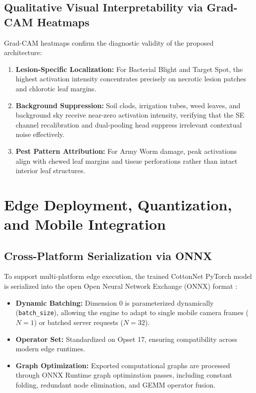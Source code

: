 \documentclass[journal,10pt,twocolumn]{IEEEtran}
\begin{document}
\subsection{Qualitative Visual Interpretability via Grad-CAM Heatmaps}
Grad-CAM heatmaps confirm the diagnostic validity of the proposed architecture:
\begin{enumerate}[leftmargin=*]
    \item \textbf{Lesion-Specific Localization:} For Bacterial Blight and Target Spot, the highest activation intensity concentrates precisely on necrotic lesion patches and chlorotic leaf margins.
    \item \textbf{Background Suppression:} Soil clods, irrigation tubes, weed leaves, and background sky receive near-zero activation intensity, verifying that the SE channel recalibration and dual-pooling head suppress irrelevant contextual noise effectively.
    \item \textbf{Pest Pattern Attribution:} For Army Worm damage, peak activations align with chewed leaf margins and tissue perforations rather than intact interior leaf structures.
\end{enumerate}

\section{Edge Deployment, Quantization, and Mobile Integration}

\subsection{Cross-Platform Serialization via ONNX}
To support multi-platform edge execution, the trained CottonNet PyTorch model is serialized into the open Open Neural Network Exchange (ONNX) format \cite{onnx2019}:
\begin{itemize}[leftmargin=*]
    \item \textbf{Dynamic Batching:} Dimension 0 is parameterized dynamically (\texttt{batch\_size}), allowing the engine to adapt to single mobile camera frames ($N=1$) or batched server requests ($N=32$).
    \item \textbf{Operator Set:} Standardized on Opset 17, ensuring compatibility across modern edge runtimes.
    \item \textbf{Graph Optimization:} Exported computational graphs are processed through ONNX Runtime graph optimization passes, including constant folding, redundant node elimination, and GEMM operator fusion.
\end{itemize}
\end{document}
